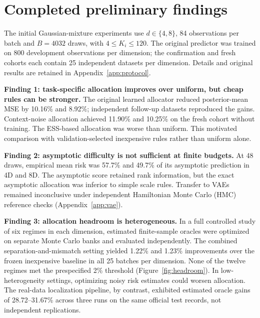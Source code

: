 \documentclass[10pt,letterpaper]{article}
\begin{document}
\section{Completed preliminary findings}
The initial Gaussian-mixture experiments use $d\in\{4,8\}$, 84 observations per batch and $B=4032$ draws, with $4\le K_i\le120$. The original predictor was trained on 800 development observations per dimension; the confirmation and fresh cohorts each contain 25 independent datasets per dimension. Details and original results are retained in Appendix~\ref{app:protocol}.

\textbf{Finding 1: task-specific allocation improves over uniform, but cheap rules can be stronger.} The original learned allocator reduced posterior-mean MSE by 10.16\% and 8.92\%; independent follow-up datasets reproduced the gains. Context-noise allocation achieved 11.90\% and 10.25\% on the fresh cohort without training. The ESS-based allocation was worse than uniform. This motivated comparison with validation-selected inexpensive rules rather than uniform alone.

\textbf{Finding 2: asymptotic difficulty is not sufficient at finite budgets.} At 48 draws, empirical mean risk was 57.7\% and 49.7\% of its asymptotic prediction in 4D and 8D. The asymptotic score retained rank information, but the exact asymptotic allocation was inferior to simple scale rules. Transfer to VAEs remained inconclusive under independent Hamiltonian Monte Carlo (HMC) reference checks (Appendix~\ref{app:vae}).

\textbf{Finding 3: allocation headroom is heterogeneous.} In a full controlled study of six regimes in each dimension, estimated finite-sample oracles were optimized on separate Monte Carlo banks and evaluated independently. The combined separation-and-mismatch setting yielded 1.22\% and 1.23\% improvements over the frozen inexpensive baseline in all 25 batches per dimension. None of the twelve regimes met the prespecified 2\% threshold (Figure~\ref{fig:headroom}). In low-heterogeneity settings, optimizing noisy risk estimates could worsen allocation. The real-data localization pipeline, by contrast, exhibited estimated oracle gains of 28.72--31.67\% across three runs on the same official test records, not independent replications.
\end{document}
